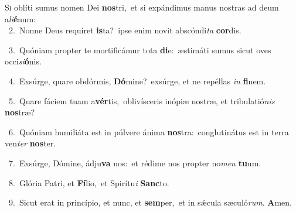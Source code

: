 \lettrine{\initial\textcolor{\initialcolor}{S}}{i} oblíti sumus nomen Dei \textbf{nos}\-tri,~\star et si expándimus manus nostras ad deum a\-\textit{li}\-\textbf{é}num:\\
{\numbfont\textcolor{\numbcolor}{~2.}}~Nonne Deus requíret \textbf{is}\-ta?~\star ipse enim novit abscóndi\textit{ta} \textbf{cor}\-dis.\par
{\numbfont\textcolor{\numbcolor}{~3.}}~Quóniam propter te mortificámur tota \textbf{di}\-e:~\star æstimáti sumus sicut oves occi\-\textit{si}\-\textbf{ó}nis.\par
{\numbfont\textcolor{\numbcolor}{~4.}}~Exsúrge, quare obdórmis, \textbf{Dó}\-mine?~\star exsúrge, et ne repéllas \textit{in} \textbf{fi}\-nem.\par
{\numbfont\textcolor{\numbcolor}{~5.}}~Quare fáciem tuam a\-\textbf{vér}\-tis,~\star oblivísceris inópiæ nostræ, et tribulatió\textit{nis} \textbf{nos}\-træ?\par
{\numbfont\textcolor{\numbcolor}{~6.}}~Quóniam humiliáta est in púlvere ánima \textbf{nos}\-tra:~\star conglutinátus est in terra ven\textit{ter} \textbf{nos}\-ter.\par
{\numbfont\textcolor{\numbcolor}{~7.}}~Exsúrge, Dómine, ádju\textbf{va} nos:~\star et rédime nos propter no\textit{men} \textbf{tu}\-um.\par
{\numbfont\textcolor{\numbcolor}{~8.}}~Glória Patri, et \textbf{Fí}\-lio,~\star et Spirítu\textit{i} \textbf{Sanc}\-to.\par
{\numbfont\textcolor{\numbcolor}{~9.}}~Sicut erat in princípio, et nunc, et \textbf{sem}\-per,~\star et in sǽcula sæculó\-\textit{rum}\-. \textbf{A}\-men.\par
